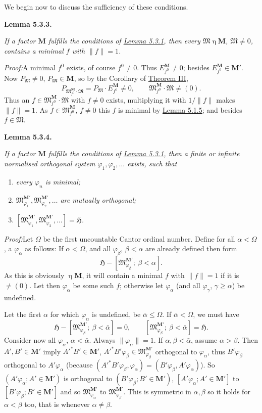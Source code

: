 \documentclass[12pt,b5paper,twoside]{article}
\newcommand{\Hspace}{\mathfrak H}
\newcommand{\M}{\mathbf M}
\newcommand{\Lemma}[1]{%
  \par\smallskip\noindent\phantomsection\label{lem:#1}\textbf{Lemma #1.}\enspace
}
\newcommand{\Proof}{\par\noindent\textit{Proof:}\enspace}
\newcommand{\lemref}[1]{\hyperref[lem:#1]{Lemma #1}}
\newcommand{\thmref}[1]{\hyperref[thm:#1]{Theorem #1}}
\begin{document}
We begin now to discuss the sufficiency of these conditions.

\Lemma{5.3.3}
\emph{If a factor $\M$ fulfills the conditions of \lemref{5.3.1}, then every
$\mathfrak M\mathrel\eta\M$, $\mathfrak M\neq0$, contains a minimal $f$ with
$\lVert f\rVert=1$.}

\Proof A minimal $f^0$ exists, of course $f^0\neq0$. Thus
$E_{f^0}^{\M}\neq0$; besides $E_{f^0}^{\M}\in\M'$. Now
$P_{\mathfrak M}\neq0$, $P_{\mathfrak M}\in\M$, so by the Corollary of
\thmref{III},
\[
 P_{\mathfrak M_{f^0}^{\M}\cdot\mathfrak M}
 =P_{\mathfrak M}\cdot E_{f^0}^{\M}\neq0,
 \qquad
 \mathfrak M_{f^0}^{\M}\cdot\mathfrak M\neq(0).
\]
Thus an $f\in\mathfrak M_{f^0}^{\M}\cdot\mathfrak M$ with $f\neq0$ exists,
multiplying it with $1/\lVert f\rVert$ makes $\lVert f\rVert=1$.
As $f\in\mathfrak M_{f^0}^{\M}$, $f\neq0$ this $f$ is minimal by
\lemref{5.1.5}; and besides $f\in\mathfrak M$.

\Lemma{5.3.4}
\emph{If a factor $\M$ fulfills the conditions of \lemref{5.3.1}, then a
finite or infinite normalised orthogonal system $\varphi_1,\varphi_2,\ldots$
exists, such that}
\begin{enumerate}[label=(\roman*)]
\item \emph{every $\varphi_n$ is minimal;}
\item \emph{$\mathfrak M_{\varphi_1}^{\M'},
  \mathfrak M_{\varphi_2}^{\M'},\ldots$ are mutually orthogonal;}
\item \emph{$[\mathfrak M_{\varphi_1}^{\M'},
  \mathfrak M_{\varphi_2}^{\M'},\ldots]=\Hspace$.}
\end{enumerate}

\Proof Let $\Omega$ be the first uncountable Cantor ordinal number. Define for
all $\alpha<\Omega$, a $\varphi_\alpha$ as follows: If $\alpha<\Omega$, and
all $\varphi_\beta$, $\beta<\alpha$ are already defined then form
\[
 \Hspace-[\mathfrak M_{\varphi_\beta}^{\M'};\ \beta<\alpha].
\]
As this is obviously $\mathrel\eta\M$, it will contain a minimal $f$ with
$\lVert f\rVert=1$ if it is $\neq(0)$. Let then $\varphi_\alpha$ be some such
$f$; otherwise let $\varphi_\alpha$ (and all $\varphi_\gamma$,
$\gamma\geq\alpha$) be undefined.

Let the first $\alpha$ for which $\varphi_\alpha$ is undefined, be
$\bar\alpha\leq\Omega$. If $\bar\alpha<\Omega$, we must have
\[
 \Hspace-[\mathfrak M_{\varphi_\beta}^{\M'};\ \beta<\bar\alpha]=0,
 \qquad
 [\mathfrak M_{\varphi_\beta}^{\M'};\ \beta<\bar\alpha]=\Hspace.
\]
Consider now all $\varphi_\alpha$, $\alpha<\bar\alpha$. Always
$\lVert\varphi_\alpha\rVert=1$. If $\alpha,\beta<\bar\alpha$, assume
$\alpha>\beta$. Then $A',B'\in\M'$ imply $A'^*B'\in\M'$,
$A'^*B'\varphi_\beta\in\mathfrak M_{\varphi_\beta}^{\M'}$ orthogonal to
$\varphi_\alpha$, thus $B'\varphi_\beta$ orthogonal to
$A'\varphi_\alpha$ (because
$(A'^*B'\varphi_\beta,\varphi_\alpha)
=(B'\varphi_\beta,A'\varphi_\alpha)$). So
$(A'\varphi_\alpha;A'\in\M')$ is orthogonal to
$(B'\varphi_\beta;B'\in\M')$,
$[A'\varphi_\alpha;A'\in\M']$ to
$[B'\varphi_\beta;B'\in\M']$ and so
$\mathfrak M_{\varphi_\alpha}^{\M'}$ to
$\mathfrak M_{\varphi_\beta}^{\M'}$. This is symmetric in $\alpha,\beta$ so
it holds for $\alpha<\beta$ too, that is whenever $\alpha\neq\beta$.
\end{document}
